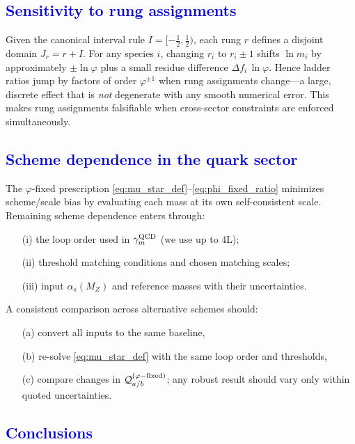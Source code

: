 \documentclass[%
amsmath,amssymb,
aps,
prb,
floatfix,showkeys
]{revtex4-2}
\newcommand{\modif}[1]{\textcolor{blue}{#1}}
\begin{document}
{\modif{\subsection{Sensitivity to rung assignments}
\label{subsec:error_rungs}}}

Given the canonical interval rule $I=[-\tfrac{1}{2},\tfrac{1}{2})$, each rung $r$ defines a disjoint domain $J_r=r+I$. For any species $i$, changing $r_i$ to $r_i\pm 1$ shifts $\ln \widehat m_i$ by approximately $\pm \ln\varphi$ plus a small residue difference $\Delta f_i\,\ln\varphi$. Hence ladder ratios jump by factors of order $\varphi^{\pm 1}$ when rung assignments change—a large, discrete effect that is \emph{not} degenerate with any smooth numerical error. This makes rung assignments falsifiable when cross-sector constraints are enforced simultaneously.

{\modif{\subsection{Scheme dependence in the quark sector}
\label{subsec:error_schemes}}}

The $\varphi$-fixed prescription \eqref{eq:mu_star_def}--\eqref{eq:phi_fixed_ratio} minimizes scheme/scale bias by evaluating each mass at its own self-consistent scale. Remaining scheme dependence enters through:
\begin{enumerate}
\item[(i)] the loop order used in $\gamma_m^{\rm QCD}$ (we use up to 4L);
\item[(ii)] threshold matching conditions and chosen matching scales;
\item[(iii)] input $\alpha_s(M_Z)$ and reference masses with their uncertainties.
\end{enumerate}
A consistent comparison across alternative schemes should:
\begin{enumerate}
\item[(a)] convert all inputs to the same baseline,
\item[(b)] re-solve \eqref{eq:mu_star_def} with the same loop order and thresholds,
\item[(c)] compare changes in $\mathcal{Q}_{a/b}^{(\varphi\rm{-fixed})}$; any robust result should vary only within quoted uncertainties.
\end{enumerate}

{\modif{\section{Conclusions}
\label{sec:conclude}}}
\end{document}
